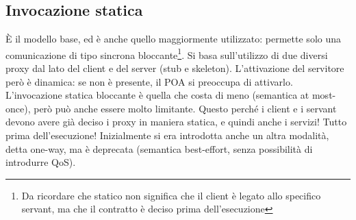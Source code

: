 \subsection{Invocazione statica}
È il modello base, ed è anche quello maggiormente utilizzato: permette solo una comunicazione di tipo sincrona
bloccante\footnote{Da ricordare che statico non significa che il client è legato allo specifico servant, ma che il
contratto è deciso prima dell'esecuzione}. Si basa sull'utilizzo di due diversi proxy dal lato del client e del server
(stub e skeleton). L'attivazione del servitore però è dinamica: se non è presente, il POA si preoccupa di attivarlo.
L'invocazione statica bloccante è quella che costa di meno (semantica at most-once), però può anche essere molto
limitante. Questo perché i client e i servant devono avere già deciso i proxy in maniera statica, e quindi anche i
servizi! Tutto prima dell'esecuzione!
Inizialmente si era introdotta anche un altra modalità, detta one-way, ma è deprecata (semantica best-effort, senza
possibilità di introdurre QoS).
